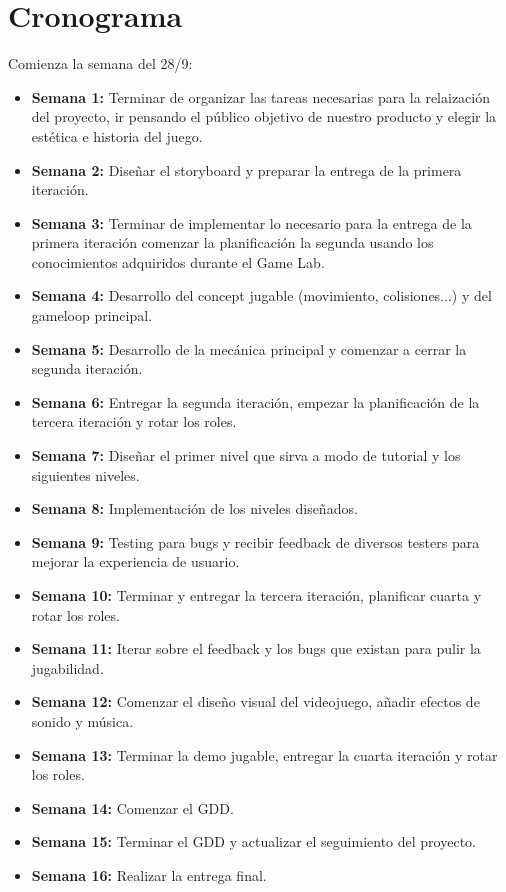 \documentclass[12pt,twoside,letterpaper]{article}
\begin{document}
\section{Cronograma}
Comienza la semana del 28/9:
\begin{itemize}
    \item \textbf{Semana 1:} Terminar de organizar las tareas necesarias para la relaización del proyecto, ir pensando el público objetivo de nuestro producto y elegir la estética e historia del juego.
    \item \textbf{Semana 2:} Diseñar el storyboard y preparar la entrega de la primera iteración.
    \item \textbf{Semana 3:} Terminar de implementar lo necesario para la entrega de la primera iteración comenzar la planificación la segunda usando los conocimientos adquiridos durante el Game Lab.
    \item \textbf{Semana 4:} Desarrollo del concept jugable (movimiento, colisiones...) y del gameloop principal.
    \item \textbf{Semana 5:} Desarrollo de la mecánica principal y comenzar a cerrar la segunda iteración.
    \item \textbf{Semana 6:} Entregar la segunda iteración, empezar la planificación de la tercera iteración y rotar los roles.
    \item \textbf{Semana 7:} Diseñar el primer nivel que sirva a modo de tutorial y los siguientes niveles.
    \item \textbf{Semana 8:} Implementación de los niveles diseñados.
    \item \textbf{Semana 9:} Testing para bugs y recibir feedback de diversos testers para mejorar la experiencia de usuario.
    \item \textbf{Semana 10:} Terminar y entregar la tercera iteración, planificar cuarta y rotar los roles.
    \item \textbf{Semana 11:} Iterar sobre el feedback y los bugs que existan para pulir la jugabilidad.
    \item \textbf{Semana 12:} Comenzar el diseño visual del videojuego, añadir efectos de sonido y música.
    \item \textbf{Semana 13:} Terminar la demo jugable, entregar la cuarta iteración y rotar los roles.
    \item \textbf{Semana 14:} Comenzar el GDD.
    \item \textbf{Semana 15:} Terminar el GDD y actualizar el seguimiento del proyecto.
    \item \textbf{Semana 16:} Realizar la entrega final.
\end{itemize}
\end{document}
